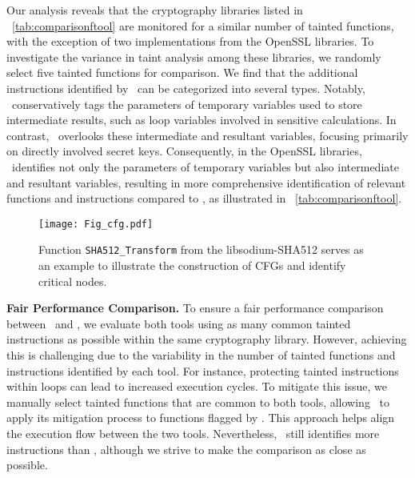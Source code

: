 Our analysis reveals that the cryptography libraries listed in \T~\ref{tab:comparisonftool} are monitored for a similar number of tainted functions, with the exception of two implementations from the OpenSSL libraries. 
To investigate the variance in taint analysis among these libraries, we randomly select five tainted functions for comparison. 
We find that the additional instructions identified by \tool\ can be categorized into several types.
Notably, \tool\ conservatively tags the parameters of temporary variables used to store intermediate results, such as loop variables involved in sensitive calculations. 
In contrast, \ftool\ overlooks these intermediate and resultant variables, focusing primarily on directly involved secret keys.
Consequently, in the OpenSSL libraries, \tool\ identifies not only the parameters of temporary variables but also intermediate and resultant variables, resulting in more comprehensive identification of relevant functions and instructions compared to \ftool, as illustrated in \T~\ref{tab:comparisonftool}.

\begin{figure}[!t]
\centering
\texttt{[image: Fig\_cfg.pdf]}
\caption{Function \texttt{SHA512\_Transform} from the libsodium-SHA512 serves as an example to illustrate the construction of CFGs and identify critical nodes.}
\label{fig:cfg}
\end{figure}

\noindent \textbf{Fair Performance Comparison.}
To ensure a fair performance comparison between \tool\ and \ftool, we evaluate both tools using as many common tainted instructions as possible within the same cryptography library. 
However, achieving this is challenging due to the variability in the number of tainted functions and instructions identified by each tool. For instance, protecting tainted instructions within loops can lead to increased execution cycles. 
To mitigate this issue, we manually select tainted functions that are common to both tools, allowing \tool\ to apply its mitigation process to functions flagged by \ftool. 
This approach helps align the execution flow between the two tools. Nevertheless, \tool\ still identifies more instructions than \ftool, although we strive to make the comparison as close as possible.

